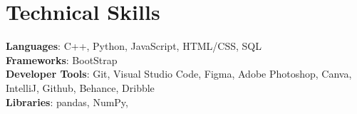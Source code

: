 \documentclass[a4paper,20pt]{article}
\begin{document}
%
\section{Technical Skills}
 \begin{itemize}[leftmargin=0.15in, label={}]
    \small{\item{
     \textbf{Languages}{: C++, Python, JavaScript, HTML/CSS, SQL} \\
     \textbf{Frameworks}{:  BootStrap  } \\
     \textbf{Developer Tools}{: Git, Visual Studio Code, Figma, Adobe Photoshop, Canva, IntelliJ, Github, Behance, Dribble} \\
     \textbf{Libraries}{: pandas, NumPy, } \\
    }}
 \end{itemize}
 \vspace{-16pt}

 
\end{document}
